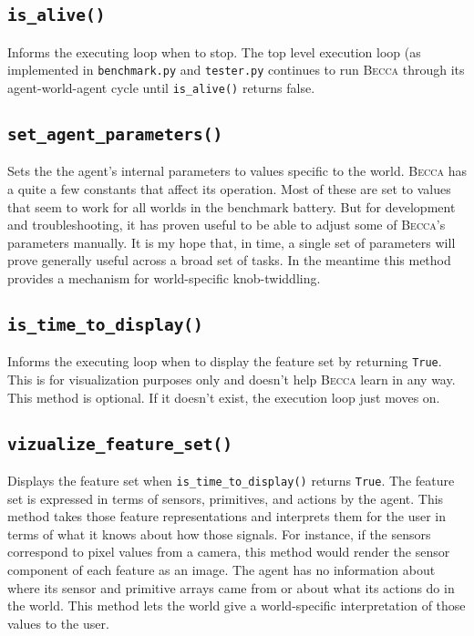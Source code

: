 \subsection{\texttt{is\_alive()}}
Informs the executing loop when to stop. The top level execution loop (as implemented in \texttt{benchmark.py} and \texttt{tester.py} continues to run \textsc{Becca} through its agent-world-agent cycle until \texttt{is\_alive()} returns false.

\subsection{\texttt{set\_agent\_parameters()}}
Sets the the agent's internal parameters to values specific to the world. \textsc{Becca} has a quite a few constants that affect its operation. Most of these are set to values that seem to work for all worlds in the benchmark battery. But for development and troubleshooting, it has proven useful to be able to adjust some of \textsc{Becca}'s parameters manually. It is my hope that, in time, a single set of parameters will prove generally useful across a broad set of tasks. In the meantime this method provides a mechanism for world-specific knob-twiddling.

\subsection{\texttt{is\_time\_to\_display()}}
Informs the executing loop when to display the feature set by returning \texttt{True}. This is for visualization purposes only and doesn't help \textsc{Becca} learn in any way. This method is optional. If it doesn't exist, the execution loop just moves on.

\subsection{\texttt{vizualize\_feature\_set()}}
Displays the feature set when \texttt{is\_time\_to\_display()} returns \texttt{True}. The feature set is expressed in terms of sensors, primitives, and actions by the agent. This method takes those feature representations and interprets them for the user in terms of what it knows about how those signals. For instance, if the sensors correspond to pixel values from a camera, this method would render the sensor component of each feature as an image. The agent has no information about where its sensor and primitive arrays came from or about what its actions do in the world. This method lets the world give a world-specific interpretation of those values to the user. 

